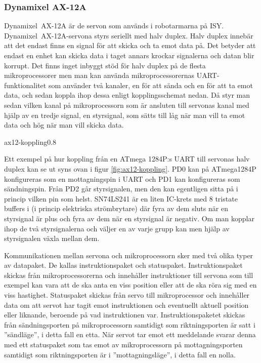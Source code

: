 \documentclass[a4paper,12pt]{article}
\begin{document}
 
\subsubsection{Dynamixel AX-12A}
 
Dynamixel~AX-12A är de servon som används i robotarmarna på ISY. Dynamixel~AX-12A-servona styrs seriellt med halv duplex. Halv duplex innebär att det endast finns en signal för att skicka och ta emot data på. Det betyder att endast en enhet kan skicka data i taget annars krockar signalerna och datan blir korrupt. Det finns inget inbyggt stöd för halv duplex på de flesta mikroprocessorer men man kan använda mikroprocessorernas UART-funktionalitet som använder två kanaler, en för att sända och en för att ta emot data, och sedan koppla ihop dessa enligt kopplingsschemat nedan. Då styr man sedan vilken kanal på mikroprocessorn som är ansluten till servonas kanal med hjälp av en tredje signal, en styrsignal,  som sätts till låg när man vill ta emot data och hög när man vill skicka data. 
 
 {ax12-koppling}{0.8} 

Ett exempel på hur koppling från en ATmega 1284P:s UART till servonas halv duplex kan se ut syns ovan i figur \ref{fig:ax12-koppling}. PD0 kan på ATmega1284P konfigureras som en mottagningspin i UART och PD1 kan konfigureras som sändningspin. Från PD2 går styrsignalen, men den kan egentligen sitta på i princip vilken pin som helst. SN74LS241 är en liten IC-krets med 8 tristate buffers i (i princip elektriska strömbrytare) där fyra av dem sluts när en styrsignal är plus och fyra av dem när en styrsignal är negativ. Om man kopplar ihop de två styrsignalerna och väljer en av varje grupp kan men hjälp av styrsignalen växla mellan dem.\cite{dyn-manual}
 
Kommunikationen mellan servona och mikroprocessorn sker med två olika typer av datapaket. De kallas instruktionspaket och statuspaket. Instruktionspaket skickas från mikroprocessorerna och innehåller instruktioner till servona som till exempel kan vara att de ska anta en viss position eller att de ska röra sig med en viss hastighet. Statuspaket skickas från servo till mikroprocessor och innehåller data om att servot har tagit emot instruktionen och eventuellt aktuell position eller liknande, beroende på vad instruktionen var. Instruktionspaketet skickas från sändningsporten på mikroprocessorn samtidigt som riktningsporten är satt i ''sändläge'', i detta fall en etta. När servot tar emot ett meddelande svarar denna med ett statuspaket som tas emot av mikroprocessorn på mottagningsporten samtidigt som riktningsporten är i ''mottagningsläge'', i detta fall en nolla. 
\end{document}
